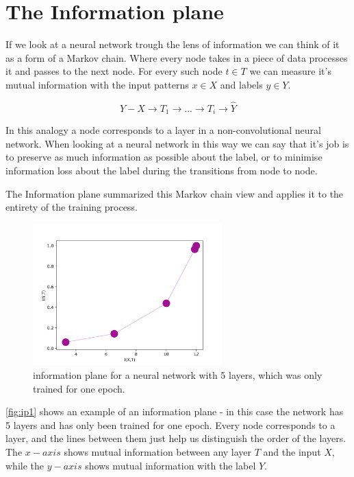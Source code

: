 \documentclass[dissertation.tex]{subfiles}
\begin{document}
\section{The Information plane}

If we look at a neural network trough the lens of information we can think of it
as a form of a Markov chain. Where every node takes in a piece of data processes
it and passes to the next node. For every such node $ t \in T $ we can measure
it's mutual information with the input patterns $ x \in X $ and labels $ y \in Y
$. 

$$ Y - X \rightarrow T_1 \rightarrow ... \rightarrow T_i \rightarrow \hat{Y} $$

In this analogy a node corresponds to a layer in a non-convolutional neural
network. When looking at a neural network in this way we can say that it's job
is to preserve as much information as possible about the label, or to minimise
information loss about the label during the transitions from node to node.

The Information plane summarized this Markov chain view and applies it to the
entirety of the training process.

\begin{figure}[H]
  \centering
  \includegraphics[width=0.65\textwidth]{figs/ip_1v2.png}
  \caption{
    information plane for a neural network with 5 layers, which was only trained
    for one epoch.
  }
  \label{fig:ip1}
\end{figure}

\autoref{fig:ip1} shows an example of an information plane - in this case the
network has 5 layers and has only been trained for one epoch. Every node
corresponds to a layer, and the lines between them just help us distinguish the
order of the layers. The $ x-axis $ shows mutual information between any layer $
T $ and the input $ X $, while the $ y-axis $ shows mutual information with the
label $ Y $.
\end{document}
